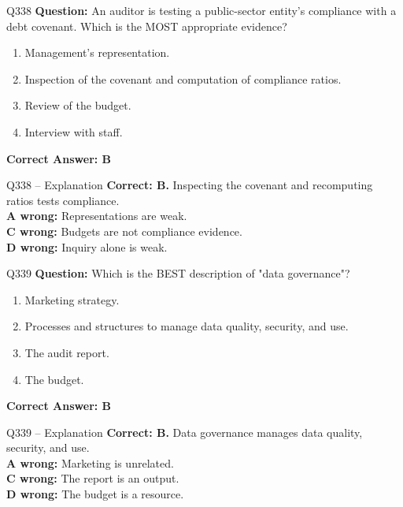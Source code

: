 \documentclass[aspectratio=169,10pt]{beamer}
\begin{document}
	\begin{frame}[t]{Q338}
		\small
		\textbf{Question:} An auditor is testing a public-sector entity's compliance with a debt covenant. Which is the MOST appropriate evidence?
		\begin{enumerate}[label=\Alph*.,itemsep=1pt,topsep=2pt]
			\item Management's representation.
			\item Inspection of the covenant and computation of compliance ratios.
			\item Review of the budget.
			\item Interview with staff.
		\end{enumerate}
		\vspace{4pt}
		\textbf{Correct Answer: B}
	\end{frame}
	
	\begin{frame}[t]{Q338 -- Explanation}
		\small
		\textbf{Correct: B.} Inspecting the covenant and recomputing ratios tests compliance. \\[4pt]
		\textbf{A wrong:} Representations are weak. \\[2pt]
		\textbf{C wrong:} Budgets are not compliance evidence. \\[2pt]
		\textbf{D wrong:} Inquiry alone is weak.
	\end{frame}
	
	\begin{frame}[t]{Q339}
		\small
		\textbf{Question:} Which is the BEST description of "data governance"?
		\begin{enumerate}[label=\Alph*.,itemsep=1pt,topsep=2pt]
			\item Marketing strategy.
			\item Processes and structures to manage data quality, security, and use.
			\item The audit report.
			\item The budget.
		\end{enumerate}
		\vspace{4pt}
		\textbf{Correct Answer: B}
	\end{frame}
	
	\begin{frame}[t]{Q339 -- Explanation}
		\small
		\textbf{Correct: B.} Data governance manages data quality, security, and use. \\[4pt]
		\textbf{A wrong:} Marketing is unrelated. \\[2pt]
		\textbf{C wrong:} The report is an output. \\[2pt]
		\textbf{D wrong:} The budget is a resource.
	\end{frame}
	
\end{document}
